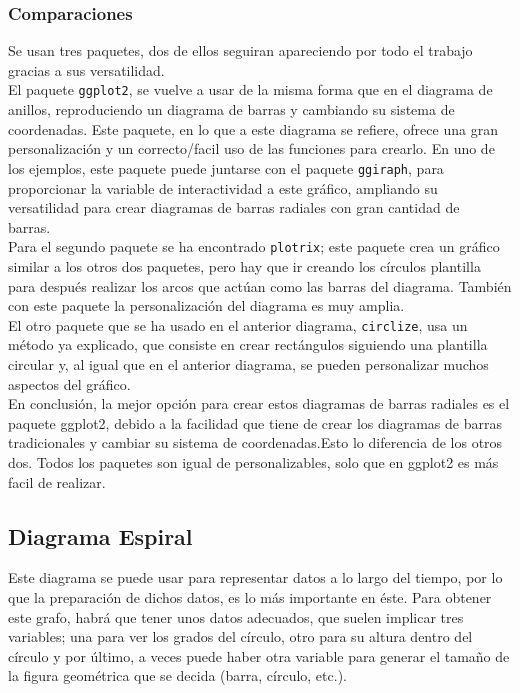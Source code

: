 \documentclass{article}\usepackage[]{graphicx}\usepackage[]{color}
\begin{document}
\subsubsection{Comparaciones}
Se usan tres paquetes, dos de ellos seguiran apareciendo por todo el trabajo gracias a sus versatilidad.~\\
El paquete \texttt{ggplot2}, se vuelve a usar de la misma forma que en el diagrama de anillos, reproduciendo un diagrama de barras y cambiando su sistema de coordenadas. Este paquete, en lo que a este diagrama se refiere, ofrece una gran personalizaci\'on y un correcto/facil uso de las funciones para crearlo. En uno de los ejemplos, este paquete puede juntarse con el paquete \texttt{ggiraph}, para proporcionar la variable de interactividad a este gr\'afico, ampliando su versatilidad para crear diagramas de barras radiales con gran cantidad de barras.~\\
Para el segundo paquete se ha encontrado \texttt{plotrix}; este paquete crea un gr\'afico similar a los otros dos paquetes, pero hay que ir creando los c\'irculos plantilla para despu\'es realizar los arcos que act\'uan como las barras del diagrama. Tambi\'en con este paquete la personalizaci\'on del diagrama es muy amplia.~\\
El otro paquete que se ha usado en el anterior diagrama, \texttt{circlize}, usa un m\'etodo ya explicado, que consiste en crear rect\'angulos siguiendo una plantilla circular y, al igual que en el anterior diagrama, se pueden personalizar muchos aspectos del gr\'afico.~\\
En conclusi\'on, la mejor opci\'on para crear estos diagramas de barras radiales es el paquete ggplot2, debido a la facilidad que tiene de crear los diagramas de barras tradicionales y cambiar su sistema de coordenadas.Esto lo diferencia de los otros dos. Todos los paquetes son igual de personalizables, solo que en ggplot2 es m\'as facil de realizar.
\clearpage
\subsection{Diagrama Espiral}\label{ssec:espiral}
Este diagrama se puede usar para representar datos a lo largo del tiempo, por lo que la preparaci\'on de dichos datos, es lo m\'as importante en \'este. 
Para obtener este grafo, habr\'a que tener unos datos adecuados, que suelen implicar tres variables; una para ver los grados del c\'irculo, otro para su altura dentro del c\'irculo y por \'ultimo, a veces puede haber otra variable para generar el tama\~no de la figura geom\'etrica que se decida (barra, c\'irculo, etc.).
\end{document}
